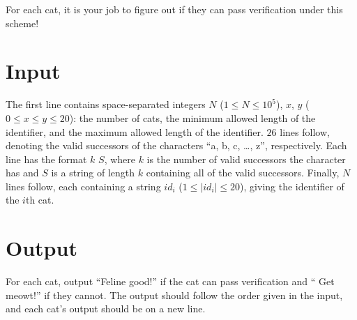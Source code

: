 For each cat, it is your job to figure out if they can pass verification under this scheme!

\section*{Input}
The first line contains space-separated integers $N$ ($1 \leq N \leq 10^5$), $x$, $y$
($0 \leq x \leq y \leq 20$): the number of cats, the minimum allowed length of the identifier, and the
maximum allowed length of the identifier.
$26$ lines follow, denoting the valid successors of the characters ``a, b, c, \ldots, z'', respectively.
Each line has the format $k$ $S$, where $k$ is the number of valid successors the character has and $S$ is a
string of length $k$ containing all of the valid successors.
Finally, $N$ lines follow, each containing a string $id_i$ ($1 \leq |id_i| \leq 20$), giving the identifier
of the $i$th cat.

\section*{Output}
For each cat, output ``Feline good!'' if the cat can pass verification and  `` Get meowt!'' if they cannot.
The output should follow the order given in the input, and each cat's output should be on a new line.
